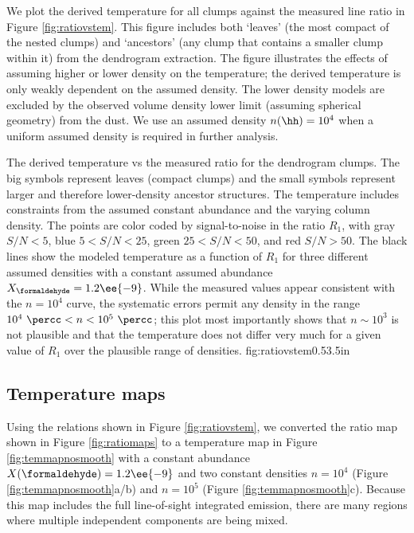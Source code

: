 We plot the derived temperature for all clumps against the measured line ratio
in Figure \ref{fig:ratiovstem}.  This figure includes both `leaves' (the most
compact of the nested clumps) and `ancestors' (any clump that contains a
smaller clump within it)
from the dendrogram extraction.  The figure illustrates the effects of assuming
higher or lower density on the temperature; the derived temperature is only weakly dependent
on the assumed density. The lower density models are excluded by
the observed volume density lower limit (assuming spherical geometry) from the
dust.  We use an assumed density $n(\hh)=10^4$ \percc when a uniform assumed
density is required in further analysis.

{The derived temperature vs the measured ratio \Rone for the dendrogram clumps.
The big symbols represent leaves (compact clumps) and the small symbols
represent larger and therefore lower-density ancestor structures.
The temperature includes constraints from the assumed constant \formaldehyde
abundance and the 
varying column density.  The points are color coded by signal-to-noise in the
ratio $R_1$, with gray $S/N < 5$, blue $5 < S/N < 25$, green $25 < S/N < 50$,
and red $S/N > 50$.  The black lines show the modeled temperature as a function of
$R_1$ for three different assumed densities with a constant assumed abundance
$X_{\formaldehyde} = 1.2\ee{-9}$.
While the measured values appear consistent with the $n=10^4$ \percc curve, the
systematic errors permit any density in the range $10^4~\percc < n < 10^5
~\percc$; this plot most importantly shows that $n\sim10^3$ \percc is not
plausible and that the temperature does not differ very much for a given value
of $R_1$ over the plausible range of densities.
}
{fig:ratiovstem}{0.5}{3.5in}

\subsection{Temperature maps}
\label{sec:formaldehydetemmap}
Using the relations shown in Figure \ref{fig:ratiovstem}, we converted the
ratio map shown in Figure \ref{fig:ratiomaps} to a temperature map in Figure
\ref{fig:temmapnosmooth} with a constant abundance $X(\formaldehyde)=1.2\ee{-9}$ 
and two constant densities $n=10^4$ (Figure \ref{fig:temmapnosmooth}a/b) and
$n=10^5$ \percc (Figure \ref{fig:temmapnosmooth}c).  Because this map includes
the full line-of-sight integrated emission, there are many regions where
multiple independent components are being mixed.

